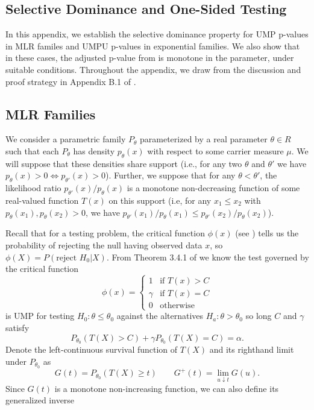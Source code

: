 \documentclass{article}
\begin{document}
\begin{appendix}
\section{Selective Dominance and One-Sided Testing}
\label{sec:one_sided_appdx}

In this appendix, we establish the selective dominance property for UMP p-values in MLR familes and UMPU p-values in exponential families. We also show that in these cases, the adjusted p-value from  is monotone in the parameter, under suitable conditions. Throughout the appendix, we draw from the discussion and proof strategy in Appendix B.1 of \cite{Lei}.

\subsection{MLR Families}
\label{sec:one_sided_mlr_appdx}

We consider a parametric family $P_{\theta}$ parameterized by a real parameter $\theta \in R$ such that each $P_{\theta}$ has density $p_{\theta}(x)$ with respect to some carrier measure $\mu$. We will suppose that these densities share support (i.e., for any two $\theta$ and $\theta'$ we have $p_{\theta}(x) > 0 \iff p_{\theta'}(x)> 0$). Further, we suppose that for any $\theta < \theta'$, the likelihood ratio $p_{\theta'}(x)/p_{\theta}(x)$ is a monotone non-decreasing function of some real-valued function $T(x)$ on this support (i.e, for any $x_1 \leq x_2$ with $p_{\theta}(x_1), p_{\theta}(x_2) > 0$, we have $p_{\theta'}(x_1)/p_{\theta}(x_1) \leq p_{\theta'}(x_2)/p_{\theta}(x_2)$). 

Recall that for a testing problem, the critical function $\phi(x)$ (see \cite[Section 3.1]{Lehmann}) tells us the probability of rejecting the null having observed data $x$, so $\phi(X) = P(\text{reject } H_0 | X)$. From Theorem 3.4.1 of \cite{Lehmann} we know the test governed by the critical function 
\begin{equation}
    \label{eq:mlr_test}
    \phi(x) = \begin{cases}
        1 &\text{if } T(x) > C  \\
        \gamma &\text{if } T(x) = C  \\
        0 & \text{otherwise }
    \end{cases}
\end{equation}
is UMP for testing $H_0 : \theta \leq \theta_0$ against the alternatives $H_a : \theta > \theta_0 $ so long $C$ and $\gamma$ satisfy
\begin{equation}
    \label{eq:constraint}
    P_{\theta_0}(T(X) > C) + \gamma P_{\theta_0}(T(X) = C) = \alpha.
\end{equation}
Denote the left-continuous survival function of $T(X)$ and its righthand limit under $P_{\theta_0}$ as
\begin{equation*}
    G(t) = P_{\theta_0}(T(X) \geq t) \qquad G^+(t) = \lim_{u \downarrow t} G(u).
\end{equation*}
Since $G(t)$ is a monotone non-increasing function, we can also define its generalized inverse 


\end{appendix}
\end{document}
